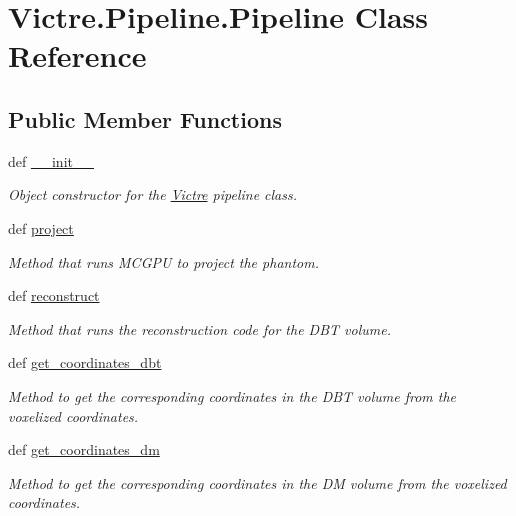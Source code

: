 \hypertarget{classVictre_1_1Pipeline_1_1Pipeline}{\section{Victre.\-Pipeline.\-Pipeline Class Reference}
\label{classVictre_1_1Pipeline_1_1Pipeline}
}
\subsection*{Public Member Functions}
\begin{DoxyCompactItemize}
\item 
def \hyperlink{classVictre_1_1Pipeline_1_1Pipeline_a45627045131474e1dc8c218655aee2b2}{\-\_\-\-\_\-init\-\_\-\-\_\-}
\begin{DoxyCompactList}\small\item\em Object constructor for the \hyperlink{namespaceVictre}{Victre} pipeline class. \end{DoxyCompactList}\item 
def \hyperlink{classVictre_1_1Pipeline_1_1Pipeline_a372ba5d565da4224e4768316ac640f99}{project}
\begin{DoxyCompactList}\small\item\em Method that runs M\-C\-G\-P\-U to project the phantom. \end{DoxyCompactList}\item 
def \hyperlink{classVictre_1_1Pipeline_1_1Pipeline_ab7dbcc6b27ab4e563391e2d76045f609}{reconstruct}
\begin{DoxyCompactList}\small\item\em Method that runs the reconstruction code for the D\-B\-T volume. \end{DoxyCompactList}\item 
def \hyperlink{classVictre_1_1Pipeline_1_1Pipeline_a27d92d6338fea609839441a7f644ae41}{get\-\_\-coordinates\-\_\-dbt}
\begin{DoxyCompactList}\small\item\em Method to get the corresponding coordinates in the D\-B\-T volume from the voxelized coordinates. \end{DoxyCompactList}\item 
def \hyperlink{classVictre_1_1Pipeline_1_1Pipeline_a404619920d58648ef74e6307d8b6a7dc}{get\-\_\-coordinates\-\_\-dm}
\begin{DoxyCompactList}\small\item\em Method to get the corresponding coordinates in the D\-M volume from the voxelized coordinates. \end{DoxyCompactList}\item 

\end{DoxyCompactItemize}
